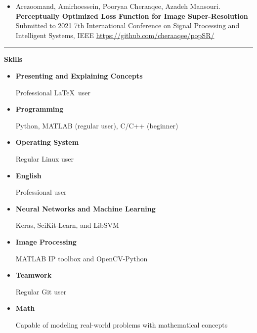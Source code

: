 \documentclass{letter}
\begin{document}
\begin{multicols}{2}
\begin{itemize}
		\item Arezoomand, Amirhoessein, Pooryaa Cheraaqee, Azadeh Mansouri. \textbf{Perceptually Optimized Loss Function for Image Super-Resolution} Submitted to 2021 7th International Conference on Signal Processing and Intelligent Systems, IEEE \href{https://github.com/cheraaqee/popSR/}{https://github.com/cheraaqee/popSR/}
	\end{itemize}
\noindent \rule{\columnwidth}{2pt}

\begin{Large}
	\textbf{Skills}
\end{Large}
	\begin{itemize}
		\item \textbf{Presenting and Explaining Concepts}

			Professional \LaTeX~user

		\item \textbf{Programming}

Python, MATLAB (regular user), C/C++ (beginner)

\item{\textbf{Operating System}}

Regular Linux user

\item \textbf{English}

Professional user

\item \textbf{Neural Networks and Machine Learning}

Keras, SciKit-Learn,  and LibSVM

\item \textbf{Image Processing}

MATLAB IP toolbox and OpenCV-Python

\item \textbf{Teamwork}

Regular Git user

\item \textbf{Math}

Capable of modeling real-world problems with mathematical concepts
	\end{itemize}


\end{multicols}
\end{document}
